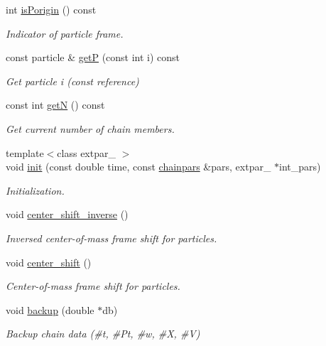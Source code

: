 \begin{DoxyCompactItemize}
int \hyperlink{classARC_1_1chain_a7ced7404d896ed78a109868a10ee6b56}{is\+Porigin} () const
\begin{DoxyCompactList}\small\item\em Indicator of particle frame. \end{DoxyCompactList}\item 
const particle \& \hyperlink{classARC_1_1chain_a256800adf6453d8550cdc6c3212959a0}{getP} (const int i) const
\begin{DoxyCompactList}\small\item\em Get particle i (const reference) \end{DoxyCompactList}\item 
const int \hyperlink{classARC_1_1chain_a6069646256b45896e6395205826ad05f}{getN} () const
\begin{DoxyCompactList}\small\item\em Get current number of chain members. \end{DoxyCompactList}\item 
{\footnotesize template$<$class extpar\+\_\+ $>$ }\\void \hyperlink{classARC_1_1chain_a9ddc18539223abcb6451805abc15aea9}{init} (const double time, const \hyperlink{classARC_1_1chainpars}{chainpars} \&pars, extpar\+\_\+ $\ast$int\+\_\+pars)
\begin{DoxyCompactList}\small\item\em Initialization. \end{DoxyCompactList}\item 
void \hyperlink{classARC_1_1chain_ab56fbddf27416cd640c535ec267cc4bc}{center\+\_\+shift\+\_\+inverse} ()
\begin{DoxyCompactList}\small\item\em Inversed center-\/of-\/mass frame shift for particles. \end{DoxyCompactList}\item 
void \hyperlink{classARC_1_1chain_a2abf3aad903a354f29764ad7c8142ab6}{center\+\_\+shift} ()
\begin{DoxyCompactList}\small\item\em Center-\/of-\/mass frame shift for particles. \end{DoxyCompactList}\item 
void \hyperlink{classARC_1_1chain_a3ad5d3a5a2e899ec55bd4aafaa18c2d2}{backup} (double $\ast$db)
\begin{DoxyCompactList}\small\item\em Backup chain data (\#t, \#\+Pt, \#w, \#X, \#V) \end{DoxyCompactList}\item 

\end{DoxyCompactItemize}
